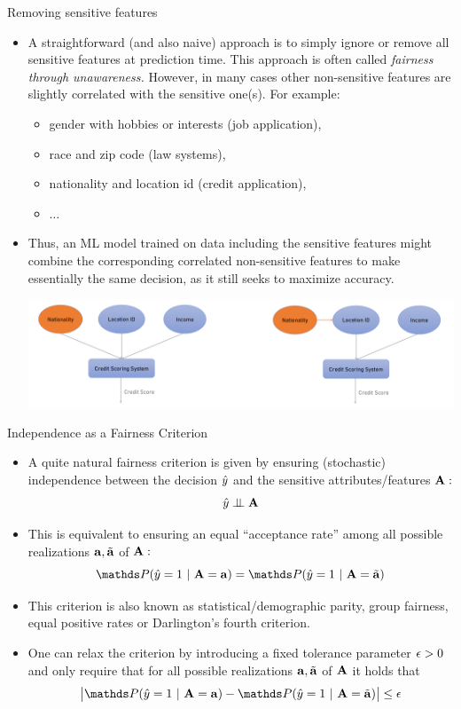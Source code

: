 \begin{frame}{Removing sensitive features}
	\small{
		\begin{itemize}
			\item A straightforward (and also naive) approach is to simply ignore or remove all sensitive features at prediction time. This approach is often called \emph{fairness through unawareness.}  However, in many cases other non-sensitive features are slightly correlated with the sensitive one(s). For example:
%			
			\begin{itemize}
				\small
%				
				\item gender with hobbies or interests (job application),
%				
				\item race and zip code (law systems),
%				
				\item nationality and location id (credit application),
%				
				\item $\ldots$
%				
			\end{itemize}
			\item Thus, an ML model trained on data including the sensitive features might combine the corresponding correlated non-sensitive features to make essentially the same decision, as it still seeks to maximize accuracy.
			\begin{center}
				\includegraphics[width=0.7\linewidth]{figure/fair_unaware}
			\end{center}
		\end{itemize}
	}
\end{frame}

\begin{vbframe}{Independence as a Fairness Criterion}
	\small{
		\begin{itemize}
			\item A quite natural fairness criterion is given by ensuring (stochastic) independence between the decision $\hat{y}$ and the sensitive attributes/features $\mathbf{A}:$
%			
			$$	\hat{y} \perp \!\!\! \perp \mathbf{A}	$$
%			
			\item This is equivalent to ensuring an equal ``acceptance rate'' among all possible realizations $\mathbf{a},\tilde{\mathbf{a}}$ of $\mathbf{A}:$
%			
			$$  \P(  \yh = 1 ~|~ \sens = \ba ) = \P(  \yh = 1 ~|~ \sens = \batilde )$$
			\item This criterion is also known as statistical/demographic parity, group fairness, equal positive rates or Darlington's fourth criterion.
%			
			\item One can relax the criterion by introducing a fixed tolerance parameter $\epsilon>0$ and only require that for all possible realizations $\mathbf{a},\tilde{\mathbf{a}}$ of $\mathbf{A}$ it holds that
%			
			$$  \big|  \P(  \yh = 1 ~|~ \sens = \ba ) - \P(  \yh = 1 ~|~ \sens = \batilde ) \big| \leq \eps $$
%		
		\end{itemize}
%	
	}
\end{vbframe}


